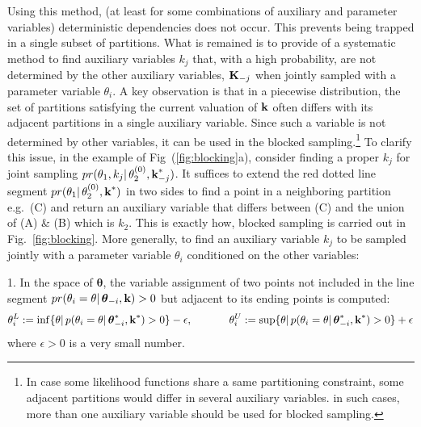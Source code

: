Using this method, (at least for some combinations of auxiliary and parameter variables) deterministic dependencies does not occur. This prevents being trapped in a single subset of partitions.
What is remained is to provide of a systematic method to find auxiliary variables $k_j$ that, with a high  probability, are not determined by the other auxiliary variables, $\textbf{K}_{-j}$ when jointly sampled with a parameter variable $\theta_i$. 
A key observation is that in a piecewise distribution,
the set of partitions satisfying the current valuation of $\textbf{k}$
often differs with its adjacent partitions in a single auxiliary variable.
Since such a variable is not determined by other variables, it can be used in the blocked sampling.\footnote{In case some likelihood functions share a same partitioning constraint, some adjacent partitions would differ in several auxiliary variables.
in such cases, more than one auxiliary variable should be used for blocked sampling.
}%
To clarify this issue, in the example of Fig~(\ref{fig:blocking}a), consider finding a proper $k_j$ 
for joint sampling $pr(\theta_1, k_j | \, \theta_2^{(0)}, \textbf{k}_{-j}^*)$. It suffices to extend the red dotted line segment $pr(\theta_1 | \, \theta_2^{(0)}, \textbf{k}^*)$ in two sides to find a point in a neighboring partition e.g.\ (C) and return an auxiliary variable that differs between (C) and the union of (A) \& (B) which is $k_2$. This is exactly how, blocked sampling is carried out in Fig.~\ref{fig:blocking}. 
More generally, to find an auxiliary variable $k_j$ to be sampled jointly with a parameter variable $\theta_i$ conditioned on the other variables: 

1.  In the space of $\boldsymbol \theta$,
the variable assignment of two points not included in the line segment
$pr(\theta_i = \theta | \, \boldsymbol{\theta}_{-i}, \textbf{k})>0$ 
but adjacent to its ending points is computed: 
\begin{align*}
\theta_i^L := \inf   \{ \theta |\, p(\theta_i = \theta | \, \boldsymbol{\theta}_{-i}^*, \bvec{k}^*)>0 \} - \epsilon, \hspace{12mm}
\theta_i^U := \sup \{ \theta |\, p(\theta_i = \theta | \, \boldsymbol{\theta}_{-i}^*, \bvec{k}^*)>0 \} + \epsilon
\end{align*}
where $\epsilon>0$ is a very small number.

